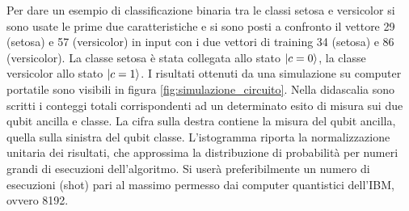 Per dare un esempio di classificazione binaria tra le classi setosa e 
versicolor si sono usate le prime due caratteristiche e si sono posti 
a confronto il vettore 29 (setosa) e 57 (versicolor) in input con i 
due vettori di training 34 (setosa) e 86 (versicolor). 
La classe setosa è stata collegata allo stato $\ket{c=0}$, la classe 
versicolor allo stato $\ket{c=1}$.
I risultati ottenuti da una simulazione su computer portatile sono 
visibili in figura \ref{fig:simulazione_circuito}. 
Nella didascalia sono scritti i conteggi totali corrispondenti ad un determinato 
esito di misura sui due qubit ancilla e classe. 
La cifra sulla destra contiene la misura del qubit ancilla, quella sulla 
sinistra del qubit classe. 
L'istogramma riporta la normalizzazione unitaria dei risultati, che approssima 
la distribuzione di probabilità per numeri grandi di esecuzioni dell'algoritmo. 
Si userà preferibilmente un numero di esecuzioni (shot) pari al massimo permesso 
dai computer quantistici dell'IBM, ovvero 8192. 



